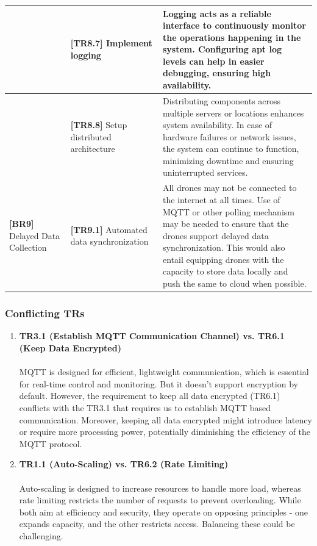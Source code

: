 \documentclass{article}
\begin{document}
\begin{table}[H]
\begin{tabular}{|p{0.2\linewidth}| p{0.3\linewidth} | p{0.5\linewidth} |}
         &  \textbf{[TR8.7]} Implement logging& Logging acts as a reliable interface to continuously monitor the operations happening in the system. Configuring apt log levels can help in easier debugging, ensuring high availability.\\ \hline
         &  \textbf{[TR8.8]} \label{TR8.8} Setup distributed architecture& Distributing components across multiple servers or locations enhances system availability. In case of hardware failures or network issues, the system can continue to function, minimizing downtime and ensuring uninterrupted services. \cite{multi-region architecture}\\ \hline
         \textbf{[BR9]} Delayed Data Collection&  \textbf{[TR9.1]} Automated data synchronization& All drones may not be connected to the internet at all times. Use of MQTT or other polling mechanism may be needed to ensure that the drones support delayed data synchronization. This would also entail equipping drones with the capacity to store data locally and push the same to cloud when possible. \cite{Delayed data}\\ \hline
    \end{tabular}
\end{table}

\newpage
\subsubsection{Conflicting TRs}
\begin{enumerate}
    \item \textbf{TR3.1 (Establish MQTT Communication Channel) vs. TR6.1 (Keep Data Encrypted)}\\\\
    MQTT is designed for efficient, lightweight communication, which is essential for real-time control and monitoring. But it doesn't support encryption by default. However, the requirement to keep all data encrypted (TR6.1) conflicts with the TR3.1 that requires us to establish MQTT based communication. Moreover, keeping all data encrypted might introduce latency or require more processing power, potentially diminishing the efficiency of the MQTT protocol.    
    \item \textbf{TR1.1 (Auto-Scaling) vs. TR6.2 (Rate Limiting)}\\\\
    Auto-scaling is designed to increase resources to handle more load, whereas rate limiting restricts the number of requests to prevent overloading. While both aim at efficiency and security, they operate on opposing principles - one expands capacity, and the other restricts access. Balancing these could be challenging.

\end{enumerate}
\end{document}
